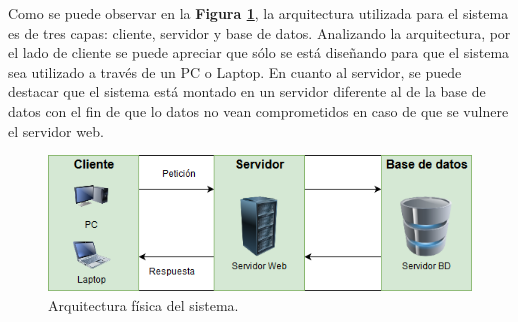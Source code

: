 Como se puede observar en la \textbf{Figura \ref{fig: Arquitectura_Fisica}}, la arquitectura utilizada para el sistema es de tres capas: cliente, servidor y base de datos. Analizando la arquitectura, por el lado de cliente se puede apreciar que sólo se está diseñando para que el sistema sea utilizado a través de un PC o Laptop. En cuanto al servidor, se puede destacar que el sistema está montado en un servidor diferente al de la base de datos con el fin de que lo datos no vean comprometidos en caso de que se vulnere el servidor web.

\begin{figure}[htb]
    \includegraphics[width=\textwidth]{Imagenes/Arquitectura_Fisica.png}
    \caption{\label{fig: Arquitectura_Fisica}Arquitectura física del sistema.}
\end{figure}